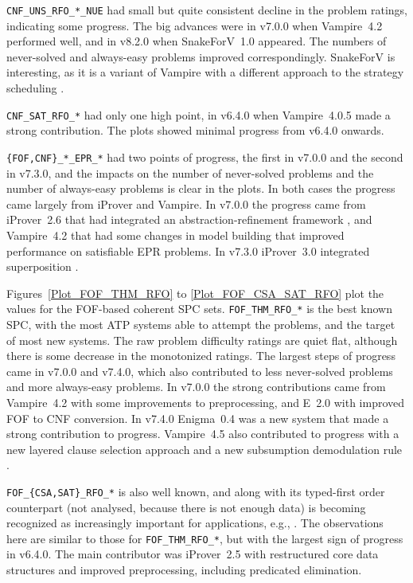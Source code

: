 \documentclass[runningheads]{llncs}
\begin{document}
{\tt CNF\_UNS\_RFO\_*\_NUE} had small but quite consistent decline in the problem ratings, 
indicating some progress.
The big advances were in v7.0.0 when Vampire~4.2 performed well, and in v8.2.0 when SnakeForV~1.0
appeared.
The numbers of never-solved and always-easy problems improved correspondingly.
SnakeForV is interesting, as it is a variant of Vampire with a different approach to the strategy
scheduling \cite{Sud22}.

{\tt CNF\_SAT\_RFO\_*} had only one high point, in v6.4.0 when Vampire~4.0.5 made a strong
contribution.
The plots showed minimal progress from v6.4.0 onwards.

{\tt \{FOF,CNF\}\_*\_EPR\_*} had two points of progress, the first in v7.0.0 and the second in
v7.3.0, and the impacts on the number of never-solved problems and the number of always-easy 
problems is clear in the plots.
In both cases the progress came largely from iProver and Vampire.
In v7.0.0 the progress came from iProver~2.6 that had integrated an abstraction-refinement 
framework \cite{HK17}, and Vampire~4.2 that had some changes in model building that improved 
performance on satisfiable EPR problems.
In v7.3.0 iProver~3.0 integrated superposition \cite{DK20}.

Figures~\ref{Plot_FOF_THM_RFO} to \ref{Plot_FOF_CSA_SAT_RFO} plot the values for the FOF-based 
coherent SPC sets.
{\tt FOF\_THM\_RFO\_*} is the best known SPC, with the most ATP systems able to attempt the 
problems, and the target of most new systems.
The raw problem difficulty ratings are quiet flat, although there is some decrease in the
monotonized ratings.
The largest steps of progress came in v7.0.0 and v7.4.0, which also contributed to less 
never-solved problems and more always-easy problems.
In v7.0.0 the strong contributions came from Vampire~4.2 with some improvements to preprocessing, 
and E~2.0 with improved FOF to CNF conversion.
In v7.4.0 Enigma~0.4 \cite{JU17,JC+20} was a new system that made a strong contribution to 
progress.
Vampire~4.5 also contributed to progress with a new layered clause selection approach 
\cite{GS20} and a new subsumption demodulation rule \cite{GKR20}.

{\tt FOF\_\{CSA,SAT\}\_RFO\_*} is also well known, and along with its typed-first order
counterpart (not analysed, because there is not enough data) is becoming recognized as 
increasingly important for applications, e.g., \cite{DKW08}.
The observations here are similar to those for {\tt FOF\_THM\_RFO\_*}, but with the largest
sign of progress in v6.4.0.
The main contributor was iProver~2.5 with restructured core data structures and improved 
preprocessing, including predicated elimination.
\end{document}
